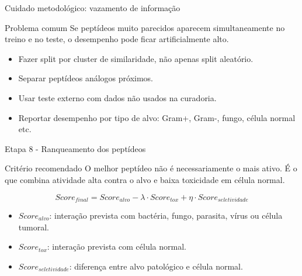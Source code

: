 \documentclass[aspectratio=169,10pt]{beamer}
\begin{document}
\begin{frame}{Cuidado metodológico: vazamento de informação}
\begin{block}{Problema comum}
Se peptídeos muito parecidos aparecem simultaneamente no treino e no teste, o desempenho pode ficar artificialmente alto.
\end{block}

\vspace{0.2cm}
\begin{itemize}
  \item Fazer split por cluster de similaridade, não apenas split aleatório.
  \item Separar peptídeos análogos próximos.
  \item Usar teste externo com dados não usados na curadoria.
  \item Reportar desempenho por tipo de alvo: Gram+, Gram-, fungo, célula normal etc.
\end{itemize}
\end{frame}

\begin{frame}{Etapa 8 - Ranqueamento dos peptídeos}
\begin{block}{Critério recomendado}
O melhor peptídeo não é necessariamente o mais ativo. É o que combina atividade alta contra o alvo e baixa toxicidade em célula normal.
\end{block}

\vspace{0.2cm}
\begin{equation*}
  Score_{final} = Score_{alvo} - \lambda \cdot Score_{tox} + \eta \cdot Score_{seletividade}
\end{equation*}

\begin{itemize}
  \item $Score_{alvo}$: interação prevista com bactéria, fungo, parasita, vírus ou célula tumoral.
  \item $Score_{tox}$: interação prevista com célula normal.
  \item $Score_{seletividade}$: diferença entre alvo patológico e célula normal.
\end{itemize}
\end{frame}
\end{document}
